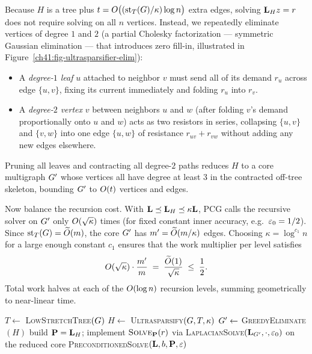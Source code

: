 Because $H$ is a tree plus $t = O\bigl((\operatorname{st}_T(G)/\kappa)\log n\bigr)$ extra edges, solving $\mathbf{L}_H z = r$ does not require solving on all $n$ vertices. Instead, we repeatedly eliminate vertices of degree $1$ and $2$ (a partial Cholesky factorization --- symmetric Gaussian elimination --- that introduces zero fill-in, illustrated in Figure~\ref{ch41:fig-ultrasparsifier-elim}):
\begin{itemize}
  \item A \emph{degree-$1$ leaf} $u$ attached to neighbor $v$ must send all of its demand $r_u$ across edge $\{u,v\}$, fixing its current immediately and folding $r_u$ into $r_v$.
  \item A \emph{degree-$2$ vertex} $v$ between neighbors $u$ and $w$ (after folding $v$'s demand proportionally onto $u$ and $w$) acts as two resistors in series, collapsing $\{u,v\}$ and $\{v,w\}$ into one edge $\{u,w\}$ of resistance $r_{uv} + r_{vw}$ without adding any new edges elsewhere.
\end{itemize}
Pruning all leaves and contracting all degree-$2$ paths reduces $H$ to a core multigraph $G'$ whose vertices all have degree at least $3$ in the contracted off-tree skeleton, bounding $G'$ to $O(t)$ vertices and edges.

Now balance the recursion cost. With $\mathbf{L} \preceq \mathbf{L}_H \preceq \kappa\mathbf{L}$, PCG calls the recursive solver on $G'$ only $O(\sqrt{\kappa})$ times (for fixed constant inner accuracy, e.g.\ $\varepsilon_0 = 1/2$). Since $\operatorname{st}_T(G) = \widetilde{O}(m)$, the core $G'$ has $m' = \widetilde{O}(m/\kappa)$ edges. Choosing $\kappa = \log^{c_1} n$ for a large enough constant $c_1$ ensures that the work multiplier per level satisfies
\[
  O(\sqrt{\kappa}) \cdot \frac{m'}{m} \;=\; \frac{\widetilde{O}(1)}{\sqrt{\kappa}} \;\le\; \frac{1}{2} .
\]
Total work halves at each of the $O(\log n)$ recursion levels, summing geometrically to near-linear time.

\begin{algorithm}[htbp]
\DontPrintSemicolon
\caption{\textsc{LaplacianSolve}$(\Lap,b,\eps)$ --- recursive preconditioned solver}\label{ch41:alg-solver}
$T\gets$ \textsc{LowStretchTree}$(G)$ 
$H\gets$ \textsc{Ultrasparsify}$(G,T,\kappa)$ 
$G'\gets$ \textsc{GreedyEliminate}$(H)$ 
build $\mathbf{P}=\mathbf{L}_H$; implement $\textsc{Solve}_{\mathbf{P}}(r)$ via \textsc{LaplacianSolve}$(\mathbf{L}_{G'},\cdot,\varepsilon_0)$ on the reduced core\;
\Return \textsc{PreconditionedSolve}$(\mathbf{L},b,\mathbf{P},\varepsilon)$ 
\end{algorithm}

